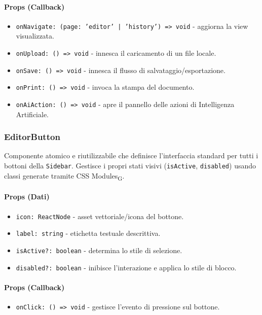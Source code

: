 \documentclass[11pt,a4paper]{article}
\newcommand{\gls}[1]{#1\textsubscript{G}}
\begin{document}
\paragraph{Props (Callback)}
\begin{itemize}
    \item \texttt{onNavigate: (page: 'editor' | 'history') => void} - aggiorna la view visualizzata.
    \item \texttt{onUpload: () => void} - innesca il caricamento di un file locale.
    \item \texttt{onSave: () => void} - innesca il flusso di salvataggio/esportazione.
    \item \texttt{onPrint: () => void} - invoca la stampa del documento.
    \item \texttt{onAiAction: () => void} - apre il pannello delle azioni di Intelligenza Artificiale.
\end{itemize}


\subsubsection{EditorButton}
Componente atomico e riutilizzabile che definisce l'interfaccia standard per tutti i bottoni della \texttt{Sidebar}. Gestisce i propri stati visivi (\texttt{isActive}, \texttt{disabled}) usando classi generate tramite \gls{CSS Modules}.

\paragraph{Props (Dati)}
\begin{itemize}
    \item \texttt{icon: ReactNode} - asset vettoriale/icona del bottone.
    \item \texttt{label: string} - etichetta testuale descrittiva.
    \item \texttt{isActive?: boolean} - determina lo stile di selezione.
    \item \texttt{disabled?: boolean} - inibisce l'interazione e applica lo stile di blocco.
\end{itemize}

\paragraph{Props (Callback)}
\begin{itemize}
    \item \texttt{onClick: () => void} - gestisce l'evento di pressione sul bottone.
\end{itemize}
\end{document}
